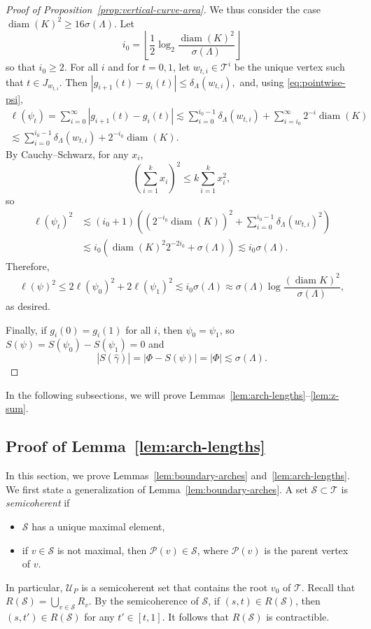 \documentclass[12pt,reqno]{amsart}
\newcommand{\cP}{\mathcal{P}}
\newcommand{\cS}{\mathcal{S}}
\newcommand{\cT}{\mathcal{T}}
\newcommand{\cU}{\mathcal{U}}
\theoremstyle{remark}
\newcommand{\0}{\mathbf{0}}
\renewcommand{\1}{\mathbf 1}
\DeclareMathOperator{\diam}{diam}
\begin{document}
\begin{proof}[Proof of Proposition~\ref{prop:vertical-curve-area}]
  We thus consider the case $\diam(K)^2 \ge 16 \sigma(\Lambda)$. Let
  $$i_0=\left\lfloor \frac{1}{2} \log_2 \frac{\diam(K)^2}{\sigma(\Lambda)}\right\rfloor$$
  so that $i_0\ge 2$.
  For all $i$ and for $t=0,1$, let $w_{t,i}\in \cT^i$ be the unique vertex such that $t\in J_{w_{t,i}}$. Then $|g_{i+1}(t) - g_i(t)| \le \delta_\Lambda(w_{t,i}),$
  and, using \eqref{eq:pointwise-psi},
  \begin{multline*}
    \ell(\psi_t) = \sum_{i=0}^\infty |g_{i+1}(t) - g_i(t)| \lesssim \sum_{i=0}^{i_0-1} \delta_\Lambda(w_{t,i}) + \sum_{i=i_0}^{\infty}  2^{-i}\diam(K) \\ \lesssim  \sum_{i=0}^{i_0-1} \delta_\Lambda(w_{t,i}) + 2^{-i_0} \diam(K).
  \end{multline*}
  By Cauchy--Schwarz, for any $x_i$, 
  $$\left(\sum_{i=1}^{k} x_i \right)^2 \le k\sum_{i=1}^k x_i^2,$$
  so 
  \[
  \begin{aligned}
    \ell(\psi_t)^2 &\lesssim (i_0 + 1) \left(( 2^{-i_0} \diam(K))^2 + \sum_{i=0}^{i_0-1} \delta_\Lambda(w_{t,i})^2\right)\\ 
    &\lesssim i_0 \left(\diam(K)^2 2^{-2i_0} + \sigma(\Lambda)\right) 
    \lesssim i_0 \sigma(\Lambda).
    \end{aligned}
  \]
  Therefore,
  $$\ell(\psi)^2 \le 2 \ell(\psi_0)^2 + 2 \ell(\psi_1)^2\lesssim i_0 \sigma(\Lambda) \approx \sigma(\Lambda) \log \frac{(\diam K)^2}{\sigma(\Lambda)},$$
  as desired.

  Finally, if $g_i(0)=g_i(1)$ for all $i$, then $\psi_0=\psi_1$, so $S(\psi) = S(\psi_0)-S(\psi_1) = 0$ and
  $$|S(\hat{\gamma})| = |\Phi - S(\psi)| = |\Phi| \lesssim \sigma(\Lambda).$$
\end{proof}

In the following subsections, we will prove Lemmas~\ref{lem:arch-lengths}--\ref{lem:z-sum}.

\subsection{Proof of Lemma~\ref{lem:arch-lengths}}\label{sec:proof-arch-lengths}

In this section, we prove Lemmas~\ref{lem:boundary-arches}
and~\ref{lem:arch-lengths}. We first state a generalization of Lemma~\ref{lem:boundary-arches}. A set $\cS\subset \cT$ is \emph{semicoherent} if 
\begin{itemize}
\item $\cS$ has a unique maximal element,
\item if $v \in \cS$ is not maximal, then $\cP(v)\in \cS$, where $\cP(v)$ is the parent vertex of $v$.
\end{itemize}
In particular, $\cU_P$ is a semicoherent set that contains the root $v_0$ of $\cT$. Recall that $R(\cS) = \bigcup_{v\in \cS} R_v$. By the semicoherence of $\cS$, if $(s,t)\in R(\cS)$, then $(s,t')\in R(\cS)$ for any $t'\in [t,1]$. It follows that $R(\cS)$ is contractible.
\end{document}
